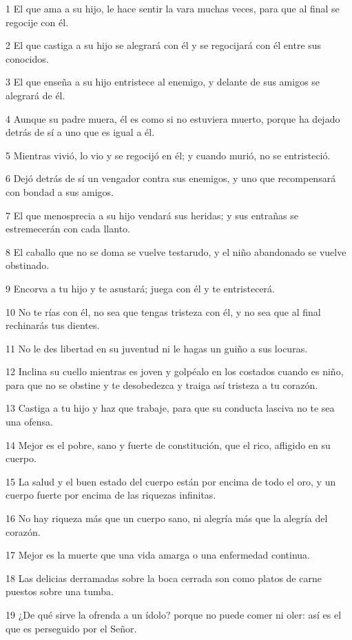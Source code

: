 \par 1 El que ama a su hijo, le hace sentir la vara muchas veces, para que al final se regocije con él.
\par 2 El que castiga a su hijo se alegrará con él y se regocijará con él entre sus conocidos.
\par 3 El que enseña a su hijo entristece al enemigo, y delante de sus amigos se alegrará de él.
\par 4 Aunque su padre muera, él es como si no estuviera muerto, porque ha dejado detrás de sí a uno que es igual a él.
\par 5 Mientras vivió, lo vio y se regocijó en él; y cuando murió, no se entristeció.
\par 6 Dejó detrás de sí un vengador contra sus enemigos, y uno que recompensará con bondad a sus amigos.
\par 7 El que menosprecia a su hijo vendará sus heridas; y sus entrañas se estremecerán con cada llanto.
\par 8 El caballo que no se doma se vuelve testarudo, y el niño abandonado se vuelve obstinado.
\par 9 Encorva a tu hijo y te asustará; juega con él y te entristecerá.
\par 10 No te rías con él, no sea que tengas tristeza con él, y no sea que al final rechinarás tus dientes.
\par 11 No le des libertad en su juventud ni le hagas un guiño a sus locuras.
\par 12 Inclina su cuello mientras es joven y golpéalo en los costados cuando es niño, para que no se obstine y te desobedezca y traiga así tristeza a tu corazón.
\par 13 Castiga a tu hijo y haz que trabaje, para que su conducta lasciva no te sea una ofensa.
\par 14 Mejor es el pobre, sano y fuerte de constitución, que el rico, afligido en su cuerpo.
\par 15 La salud y el buen estado del cuerpo están por encima de todo el oro, y un cuerpo fuerte por encima de las riquezas infinitas.
\par 16 No hay riqueza más que un cuerpo sano, ni alegría más que la alegría del corazón.
\par 17 Mejor es la muerte que una vida amarga o una enfermedad continua.
\par 18 Las delicias derramadas sobre la boca cerrada son como platos de carne puestos sobre una tumba.
\par 19 ¿De qué sirve la ofrenda a un ídolo? porque no puede comer ni oler: así es el que es perseguido por el Señor.

